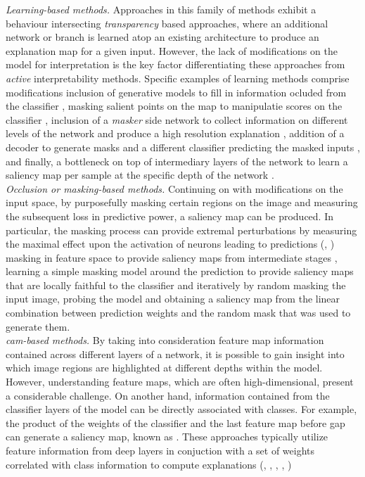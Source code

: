 \noindent \emph{Learning-based methods.} Approaches in this family of methods exhibit a behaviour 
intersecting  \emph{transparency} based approaches, where an additional network or branch is 
learned atop an existing architecture to produce an explanation map for a given input. However, 
the lack of modifications on the model for interpretation is the key factor differentiating these 
approaches from \emph{active} interpretability methods. Specific examples of learning methods 
comprise modifications inclusion of generative models to fill in information ocluded from  the 
classifier \autocite{chang2018explaining}, masking salient points on the map to manipulatie scores 
on the classifier \autocite{dabkowski2017real}, inclusion of a \emph{masker} side network to 
collect information on different levels of the network and produce a high resolution explanation 
\autocite{phang2020investigating}, addition of a decoder to generate masks and a different 
classifier predicting the masked inputs \autocite{zolna2020classifier}, and finally, a bottleneck 
on top of intermediary layers of the network to learn a saliency map per sample at the specific 
depth of the network \autocite{schulz2020restricting}.\\

\noindent \emph{Occlusion or masking-based methods.} Continuing on with modifications on the input 
space, by purposefully masking certain regions on the image and measuring the subsequent loss in 
predictive power, a saliency map can be produced. In particular, the masking process can provide 
extremal perturbations by measuring the maximal effect upon the activation of neurons leading to 
predictions (\cite{fong2017interpretable}, \cite{fong2019understanding}) masking in feature space 
to provide saliency maps from intermediate stages \autocite{schulz2020restricting}, learning a 
simple masking model around the prediction to provide saliency maps that are locally faithful to the 
classifier \autocite{ribeiro2016should} and iteratively by random masking the input image, probing 
the model and obtaining a saliency map from the linear combination between prediction weights and 
the random mask that was used to generate them. \\

\noindent \emph{\gls{cam}-based methods.} By taking into consideration feature map information 
contained across different layers of a network, it is possible to gain insight into which image 
regions are highlighted at different depths within the model. However, understanding feature maps, 
which are often high-dimensional, present a considerable challenge. On another hand, information 
contained from the classifier layers of the model can be directly associated with classes. For 
example, the product of the weights of the classifier and the last feature map before \gls{gap} 
can generate a saliency map, known as  \autocite{zhou2016learning}. These approaches 
typically utilize feature information from deep layers in conjuction with a set of weights 
correlated with class information to compute explanations (\cite{selvaraju2017grad}, 
\cite{chattopadhay2018grad}, \cite{wang2020score}, \cite{axiombased}, \cite{ablationcam}
\cite{jiang2021layercam})\\

